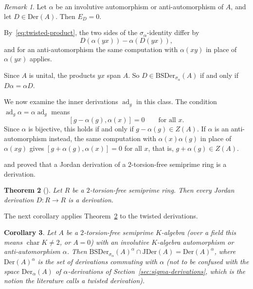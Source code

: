 \documentclass[]{interact}
\theoremstyle{plain}
\newtheorem{theorem}{Theorem}[section]
\newtheorem{corollary}[theorem]{Corollary}
\theoremstyle{definition}
\theoremstyle{remark}
\newtheorem{remark}[theorem]{Remark}
\newcommand{\Der}{\mathrm{Der}}
\newcommand{\JDer}{\mathrm{JDer}}
\newcommand{\BSDer}{\mathrm{BSDer}}
\newcommand{\ADer}{\mathrm{Der}_\alpha}
\begin{document}
\begin{remark}\label{rem:inner-twisted}
Let $\alpha$ be an involutive automorphism or anti-automorphism of $A$, and let $D \in \Der(A)$.
Then $E_D = 0$.

By~\eqref{eq:twisted-product}, the two sides of the $\sigma_\alpha$-identity differ by
\[
D(\alpha(yx)) - \alpha(D(yx)),
\]
and for an anti-automorphism the same computation with $\alpha(xy)$ in place of $\alpha(yx)$ applies.

Since $A$ is unital, the products $yx$ span $A$.
So $D \in \BSDer_{\sigma_\alpha}(A)$ if and only if $D\alpha = \alpha D$.

We now examine the inner derivations $\operatorname{ad}_g$ in this class. %
The condition $\operatorname{ad}_g \alpha = \alpha \operatorname{ad}_g$ means
\[
[g - \alpha(g), \alpha(x)] = 0 \qquad \text{for all } x.
\]
Since $\alpha$ is bijective, this holds if and only if $g - \alpha(g) \in Z(A)$.
If $\alpha$ is an anti-automorphism instead, the same computation with $\alpha(x)\alpha(g)$ in place of $\alpha(xg)$ gives $[g + \alpha(g), \alpha(x)] = 0$ for all $x$, that is, $g + \alpha(g) \in Z(A)$.
\end{remark}

\citet[Corollary 5]{Cusack1975} and \citet[Theorem 1]{Bresar1988} proved that a Jordan derivation of a $2$-torsion-free semiprime ring is a derivation.

\begin{theorem}[{\citep[Theorem 1]{Bresar1988}}]\label{thm:bresar}
Let $R$ be a $2$-torsion-free semiprime ring. Then every Jordan derivation $D \colon R \to R$ is a derivation.
\end{theorem}

The next corollary applies Theorem~\ref{thm:bresar} to the twisted derivations.

\begin{corollary}\label{cor:twisted-semiprime}
Let $A$ be a $2$-torsion-free semiprime $K$-algebra (over a field this means $\operatorname{char} K \ne 2$, or $A = 0$) with an involutive $K$-algebra automorphism or anti-automorphism $\alpha$.
Then $\BSDer_{\sigma_\alpha}(A)^\alpha \cap \JDer(A) = \Der(A)^\alpha$, where $\Der(A)^\alpha$ is the set of derivations commuting with $\alpha$ (not to be confused with the space $\ADer(A)$ of $\alpha$-derivations of Section~\ref{sec:sigma-derivations}, which is the notion the literature calls a twisted derivation).
\end{corollary}
\end{document}
